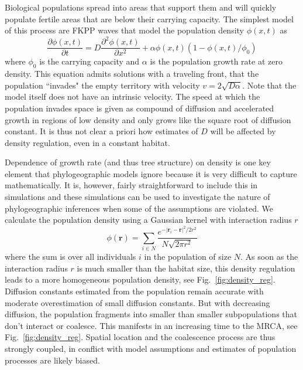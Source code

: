 \documentclass[aps,rmp, onecolumn]{revtex4}
\newcommand{\rvec}{\mathbf{r}}
\begin{document}
Biological populations spread into areas that support them and will quickly populate fertile areas that are below their carrying capacity.
The simplest model of this process are FKPP waves that model the population density $\phi(x,t)$ as \citep{fisher_wave_1937,KPP1937,hallatschek_life_2010}
\begin{equation}
    \frac{\partial \phi(x,t)}{\partial t} = D\frac{\partial^2 \phi(x,t)}{\partial x^2} + \alpha \phi(x,t)(1-\phi(x,t)/\phi_0)
\end{equation}
where $\phi_0$ is the carrying capacity and $\alpha$ is the population growth rate at zero density.
This equation admits solutions with a traveling front, that the population ``invades" the empty territory with velocity $v = 2\sqrt{D \alpha}$.
Note that the model itself does not have an intrinsic velocity.
The speed at which the population invades space is given as compound of diffusion and accelerated growth in regions of low density and only grows like the square root of diffusion constant.
It is thus not clear a priori how estimates of $D$ will be affected by density regulation, even in a constant habitat.

Dependence of growth rate (and thus tree structure) on density is one key element that phylogeographic models ignore because it is very difficult to capture mathematically.
It is, however, fairly straightforward to include this in simulations and these simulations can be used to investigate the nature of phylogeographic inferences when some of the assumptions are violated.
We calculate the population density using a Gaussian kernel with interaction radius $r$
\begin{equation}
    \phi(\rvec) = \sum_{i\in N} \frac{e^{-|\rvec_i - \rvec|^2/2r^2}}{N\sqrt{2\pi r^2}}
\end{equation}
where the sum is over all individuals $i$ in the population of size $N$.
As soon as the interaction radius $r$ is much smaller than the habitat size, this density regulation leads to a more homogeneous population density, see Fig.~\ref{fig:density_reg}.
Diffusion constants estimated from the population remain accurate with moderate overestimation of small diffusion constants.
But with decreasing diffusion, the population fragments into smaller than smaller subpopulations that don't interact or coalesce.
This manifests in an increasing time to the MRCA, see Fig.~\ref{fig:density_reg}.
Spatial location and the coalescence process are thus strongly coupled, in conflict with model assumptions and estimates of population processes are likely biased.
\end{document}

